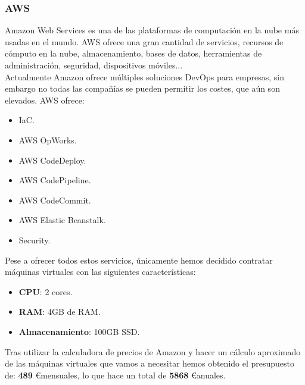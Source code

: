		\subsubsection{AWS}
			\begin{text}
				Amazon Web Services es una de las plataformas de computación en la nube más usadas en el mundo. 
				AWS ofrece una gran cantidad de servicios, recursos de cómputo en la nube, almacenamiento, bases de datos, herramientas de administración, seguridad, dispositivos móviles... \\
				Actualmente Amazon ofrece múltiples soluciones DevOps para empresas, sin embargo no todas las compañías se pueden permitir los costes, que aún son elevados. AWS ofrece:
				
				\clearpage
				\begin{itemize}
					\item IaC.
					\item AWS OpWorks.
					\item AWS CodeDeploy.	
					\item AWS CodePipeline.
					\item AWS CodeCommit.
					\item AWS Elastic Beanstalk.
					\item Security.
				\end{itemize}
			
			Pese a ofrecer todos estos servicios, únicamente hemos decidido contratar máquinas virtuales con las siguientes características:
			
			\begin{itemize}
				\item \textbf{CPU}: 2 cores.
				\item \textbf{RAM}: 4GB de RAM.
				\item \textbf{Almacenamiento}: 100GB SSD.
			\end{itemize}
			
			Tras utilizar la calculadora de precios de Amazon \cite{amazoncalculadora:online} y hacer un cálculo aproximado de las máquinas virtuales que vamos a necesitar hemos obtenido el presupuesto de: \textbf{489} \euro \space  mensuales, lo que hace un total de \textbf{5868} \euro \space anuales.
				
			\end{text}
		
